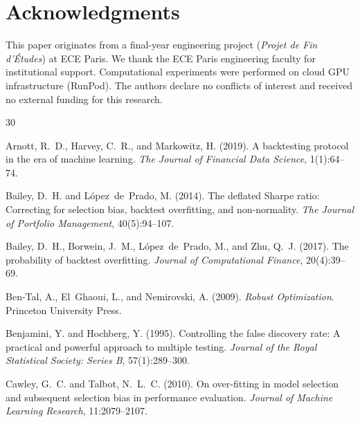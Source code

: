\documentclass[12pt,a4paper]{article}
\begin{document}
\section*{Acknowledgments}

This paper originates from a final-year engineering project (\textit{Projet de Fin d'\'{E}tudes}) at ECE Paris. We thank the ECE Paris engineering faculty for institutional support. Computational experiments were performed on cloud GPU infrastructure (RunPod). The authors declare no conflicts of interest and received no external funding for this research.



\begin{thebibliography}{30}

Arnott, R.~D., Harvey, C.~R., and Markowitz, H. (2019).
\newblock A backtesting protocol in the era of machine learning.
\newblock \emph{The Journal of Financial Data Science}, 1(1):64--74.

Bailey, D.~H. and L{\'o}pez~de~Prado, M. (2014).
\newblock The deflated Sharpe ratio: Correcting for selection bias, backtest
  overfitting, and non-normality.
\newblock \emph{The Journal of Portfolio Management}, 40(5):94--107.

Bailey, D.~H., Borwein, J.~M., L{\'o}pez~de~Prado, M., and Zhu, Q.~J. (2017).
\newblock The probability of backtest overfitting.
\newblock \emph{Journal of Computational Finance}, 20(4):39--69.

Ben-Tal, A., El~Ghaoui, L., and Nemirovski, A. (2009).
\newblock \emph{Robust Optimization}.
\newblock Princeton University Press.

Benjamini, Y. and Hochberg, Y. (1995).
\newblock Controlling the false discovery rate: A practical and powerful approach to multiple testing.
\newblock \emph{Journal of the Royal Statistical Society: Series B}, 57(1):289--300.

Cawley, G.~C. and Talbot, N.~L.~C. (2010).
\newblock On over-fitting in model selection and subsequent selection bias in performance evaluation.
\newblock \emph{Journal of Machine Learning Research}, 11:2079--2107.


\end{thebibliography}
\end{document}
